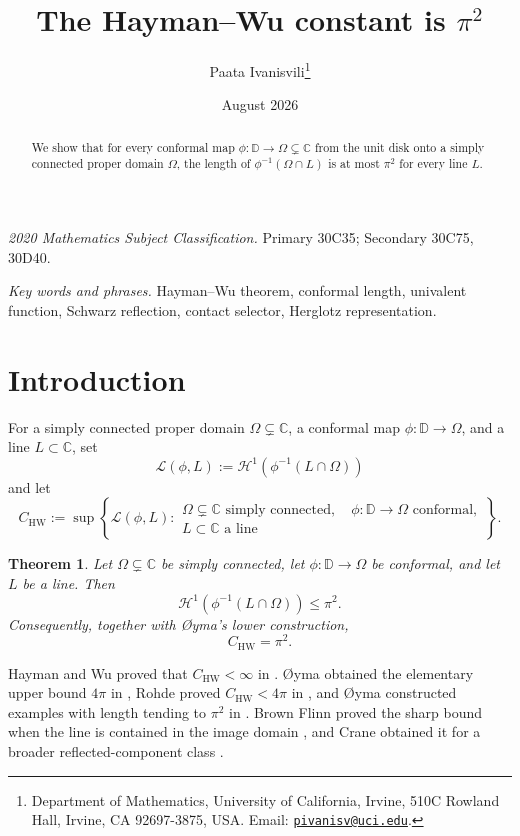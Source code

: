 \documentclass[11pt]{article}
\title{The Hayman--Wu constant is $\pi^2$}
\author{Paata Ivanisvili\thanks{Department of Mathematics, University of California,
Irvine, 510C Rowland Hall, Irvine, CA 92697-3875, USA.
Email: \href{mailto:pivanisv@uci.edu}{\texttt{pivanisv@uci.edu}}.}}
\date{August 2026}
\newtheorem{theorem}{Theorem}[section]
\theoremstyle{remark}
\newcommand{\D}{\mathbb D}
\newcommand{\C}{\mathbb C}
\newcommand{\Haus}{\mathcal H^1}
\newcommand{\HW}{C_{\mathrm{HW}}}
\begin{document}
\maketitle

\begin{abstract}
We show that for every conformal map $\phi:\mathbb D\to\Omega\subsetneq\mathbb C$
from the unit disk onto a simply connected proper domain $\Omega$, the length of
$\phi^{-1}(\Omega\cap L)$ is at most $\pi^2$ for every line $L$.
\end{abstract}

\noindent\emph{2020 Mathematics Subject Classification.}
Primary 30C35; Secondary 30C75, 30D40.

\medskip
\noindent\emph{Key words and phrases.}
Hayman--Wu theorem, conformal length, univalent function, Schwarz reflection,
contact selector, Herglotz representation.

\section{Introduction}

For a simply connected proper domain $\Omega\subsetneq\C$, a conformal map
$\phi:\D\to\Omega$, and a line $L\subset\C$, set
\[
  \mathcal L(\phi,L)
  :=\Haus\!\left(\phi^{-1}(L\cap\Omega)\right)
\]
and let
\[
  \HW:=\sup\left\{
  \mathcal L(\phi,L):
  \substack{\Omega\subsetneq\C\text{ simply connected},\quad
  \phi:\D\to\Omega\text{ conformal},\\
  L\subset\C\text{ a line}}
  \right\}.
\]

\begin{theorem}\label{thm:main}
Let $\Omega\subsetneq\C$ be simply connected, let $\phi:\D\to\Omega$ be
conformal, and let $L$ be a line. Then
\begin{equation}\label{eq:main}
  \Haus\!\left(\phi^{-1}(L\cap\Omega)\right)\le \pi^2.
\end{equation}
Consequently, together with {\O}yma's lower construction,
\[
  \HW=\pi^2.
\]
\end{theorem}

Hayman and Wu proved that $\HW<\infty$ in \cite{HaymanWu}. {\O}yma obtained
the elementary upper bound $4\pi$ in \cite{OymaHarmonic}, Rohde proved
$\HW<4\pi$ in \cite{Rohde}, and {\O}yma constructed examples with length
tending to $\pi^2$ in \cite{OymaConstant}. Brown Flinn proved the sharp
bound when the line is contained in the image domain \cite{BrownFlinn}, and
Crane obtained it for a broader reflected-component class \cite{Crane}.
\end{document}
